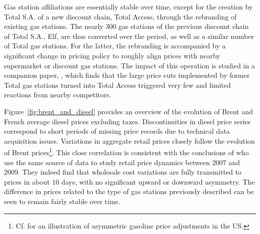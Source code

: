 \documentclass[english]{article}
\begin{document}
Gas station affiliations are essentially stable over time, except for the creation by Total S.A. of a new discount chain, Total Access, through the rebranding of existing gas stations. The nearly 300 gas stations of the previous discount chain of Total S.A., Elf, are thus converted over the period, as well as a similar number of Total gas stations. For the latter, the rebranding is accompanied by a significant change in pricing policy to roughly align prices with nearby supermarket or discount gas stations. The impact of this operation is studied in a companion paper, \cite{CHA16}, which finds that the large price cuts implemented by former Total gas stations turned into Total Access triggered very few and limited reactions from nearby competitors.

Figure~\ref{fig:brent_and_diesel} provides an overview of the evolution of Brent and French average diesel prices excluding taxes. Discontinuities in diesel price series correspond to short periods of missing price records due to technical data acquisition issues. Variations in aggregate retail prices closely follow the evolution of Brent prices\footnote{Cf. \cite{LEW11b} for an illustration of asymmetric gasoline price adjustments in the US.}. This close correlation is consistent with the conclusions of \cite{GAU15} who use the same source of data to study retail price dynamics between 2007 and 2009. They indeed find that wholesale cost variations are fully transmitted to prices in about 10 days, with no significant upward or downward asymmetry. The difference in prices related to the type of gas stations previously described can be seen to remain fairly stable over time.
\end{document}
